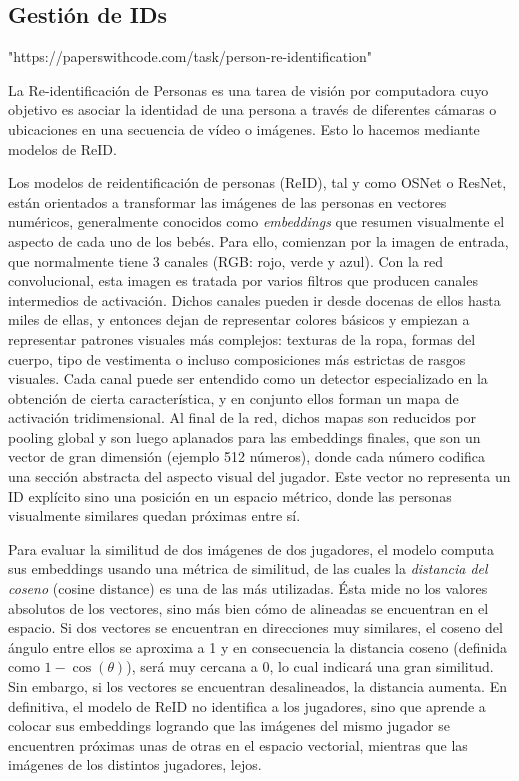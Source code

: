 \documentclass[12pt, a4paper, twoside]{article}
\begin{document}
	\subsection{Gestión de IDs}
	
	"https://paperswithcode.com/task/person-re-identification"
	
	La Re-identificación de Personas es una tarea de visión por computadora cuyo objetivo es asociar la identidad de una persona a través de diferentes cámaras o ubicaciones en una secuencia de vídeo o imágenes. Esto lo hacemos mediante modelos de ReID. 
	
	Los modelos de reidentificación de personas (ReID), tal y como OSNet o ResNet, están orientados a transformar las imágenes de las personas en vectores numéricos, generalmente conocidos como \textit{embeddings} que resumen visualmente el aspecto de cada uno de los bebés. Para ello, comienzan por la imagen de entrada, que normalmente tiene 3 canales (RGB: rojo, verde y azul). Con la red convolucional, esta imagen es tratada por varios filtros que producen canales intermedios de activación. Dichos canales pueden ir desde docenas de ellos hasta miles de ellas, y entonces dejan de representar colores básicos y empiezan a representar patrones visuales más complejos: texturas de la ropa, formas del cuerpo, tipo de vestimenta o incluso composiciones más estrictas de rasgos visuales. Cada canal puede ser entendido como un detector especializado en la obtención de cierta característica, y en conjunto ellos forman un mapa de activación tridimensional. Al final de la red, dichos mapas son reducidos por pooling global y son luego aplanados para las embeddings finales, que son un vector de gran dimensión (ejemplo 512 números), donde cada número codifica una sección abstracta del aspecto visual del jugador. Este vector no representa un ID explícito sino una posición en un espacio métrico, donde las personas visualmente similares quedan próximas entre sí.
	
	Para evaluar la similitud de dos imágenes de dos jugadores, el modelo computa sus embeddings usando una métrica de similitud, de las cuales la \textit{distancia del coseno} (cosine distance) es una de las más utilizadas. Ésta mide no los valores absolutos de los vectores, sino más bien cómo de alineadas se encuentran en el espacio. Si dos vectores se encuentran en direcciones muy similares, el coseno del ángulo entre ellos se aproxima a 1 y en consecuencia la distancia coseno (definida como $1 - \cos(\theta)$), será muy cercana a 0, lo cual indicará una gran similitud. Sin embargo, si los vectores se encuentran desalineados, la distancia aumenta. En definitiva, el modelo de ReID no identifica a los jugadores, sino que aprende a colocar sus embeddings logrando que las imágenes del mismo jugador se encuentren próximas unas de otras en el espacio vectorial, mientras que las imágenes de los distintos jugadores, lejos.
	
\end{document}
